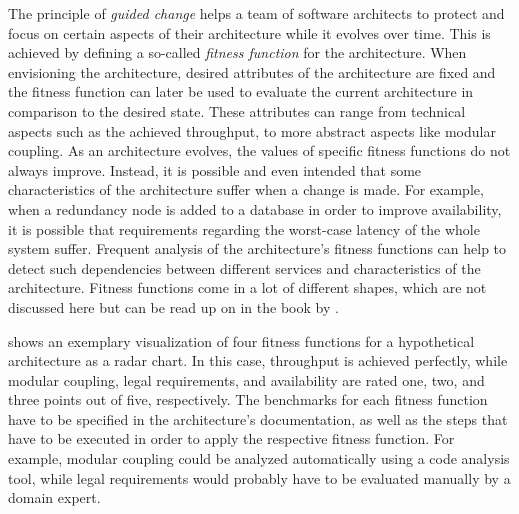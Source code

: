 The principle of \emph{guided change} helps a team of software architects to protect and focus on certain aspects of their architecture while it evolves over time.
This is achieved by defining a so-called \emph{fitness function} for the architecture.
When envisioning the architecture, desired attributes of the architecture are fixed and the fitness function can later be used to evaluate the current architecture in comparison to the desired state.
These attributes can range from technical aspects such as the achieved throughput, to more abstract aspects like modular coupling.
As an architecture evolves, the values of specific fitness functions do not always improve.
Instead, it is possible and even intended that some characteristics of the architecture suffer when a change is made.
For example, when a redundancy node is added to a database in order to improve availability, it is possible that requirements regarding the worst-case latency of the whole system suffer.
Frequent analysis of the architecture's fitness functions can help to detect such dependencies between different services and characteristics of the architecture.
Fitness functions come in a lot of different shapes, which are not discussed here but can be read up on in the book by \citet{ford2017building}.

 shows an exemplary visualization of four fitness functions for a hypothetical architecture as a radar chart.
In this case, throughput is achieved perfectly, while modular coupling, legal requirements, and availability are rated one, two, and three points out of five, respectively.
The benchmarks for each fitness function have to be specified in the architecture's documentation, as well as the steps that have to be executed in order to apply the respective fitness function.
For example, modular coupling could be analyzed automatically using a code analysis tool, while legal requirements would probably have to be evaluated manually by a domain expert.

